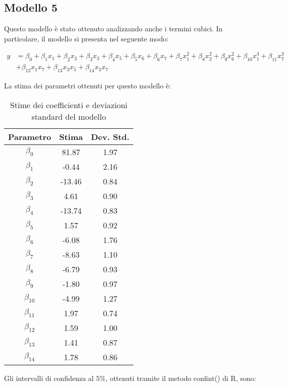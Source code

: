 \subsection{Modello 5}
Questo modello è stato ottenuto analizzando anche i termini cubici. In particolare, il modello si presenta nel seguente modo:

\begin{align*}
	y &= \beta_0 + \beta_1x_1 + \beta_2x_2 + \beta_3x_3 + \beta_4x_5 + \beta_5x_6 + \beta_6x_7 + \beta_7x_1^2 + \beta_8x_2^2 + \beta_9x_6^2 + \beta_{10}x_1^3 + \beta_{11}x_7^3 \\
	&+ \beta_{12}x_1x_7 + \beta_{13}x_3x_5 + \beta_{14}x_3x_7
\end{align*}

La stima dei parametri ottenuti per questo modello è:
\begin{table}[H]
	\centering
	\begin{tabular}{|c|c|c|}
		\hline
		\textbf{Parametro} & \textbf{Stima} & \textbf{Dev. Std.} \\
		\hline
		$\beta_0$   & 81.87  & 1.97 \\
		$\beta_1$   & -0.44  & 2.16 \\
		$\beta_2$   & -13.46 & 0.84 \\
		$\beta_3$   & 4.61   & 0.90 \\
		$\beta_4$   & -13.74  & 0.83 \\
		$\beta_5$   & 1.57 & 0.92 \\
		$\beta_6$   & -6.08   & 1.76 \\
		$\beta_7$   & -8.63  & 1.10 \\
		$\beta_8$   & -6.79  & 0.93 \\
		$\beta_9$   & -1.80  & 0.97 \\
		$\beta_{10}$ & -4.99  & 1.27 \\
		$\beta_{11}$ & 1.97   & 0.74 \\
		$\beta_{12}$ & 1.59  & 1.00 \\
		$\beta_{13}$ & 1.41   & 0.87 \\
		$\beta_{14}$ & 1.78  & 0.86 \\
		\hline
	\end{tabular}
	\caption{Stime dei coefficienti e deviazioni standard del modello}
	\label{tab:stima_coef_std}
\end{table}
Gli intervalli di confidenza al $5\%$, ottenuti tramite il metodo confint() di R, sono:
